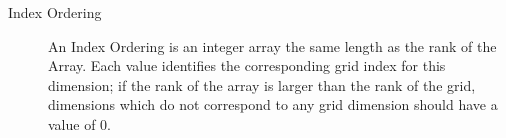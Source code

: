 


\begin{description}

\item [Index Ordering] An Index Ordering is an integer array the same
length as the rank of the Array.  Each value identifies the corresponding
grid index for this dimension; if the rank of the array is larger than
the rank of the grid, dimensions which do not correspond to any grid 
dimension should have a value of 0.

\end{description}



